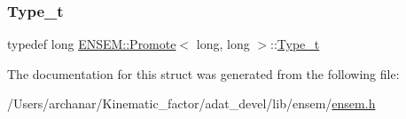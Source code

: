 \subsubsection{\texorpdfstring{Type\_t}{Type\_t}\hspace{0.1cm}{\footnotesize\ttfamily [2/2]}}
{\footnotesize\ttfamily typedef long \mbox{\hyperlink{structENSEM_1_1Promote}{E\+N\+S\+E\+M\+::\+Promote}}$<$ long, long $>$\+::\mbox{\hyperlink{structENSEM_1_1Promote_3_01long_00_01long_01_4_aa01e24c09d90acda8fe0fb2f606bde86}{Type\+\_\+t}}}



The documentation for this struct was generated from the following file\+:\begin{DoxyCompactItemize}
\item 
/\+Users/archanar/\+Kinematic\+\_\+factor/adat\+\_\+devel/lib/ensem/\mbox{\hyperlink{lib_2ensem_2ensem_8h}{ensem.\+h}}\end{DoxyCompactItemize}
